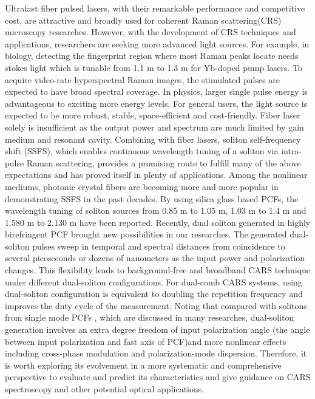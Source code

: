 \documentclass{osa-article}
\begin{document}
Ultrafast fiber pulsed lasers, with their remarkable performance and competitive cost, are attractive and broadly used for coherent Raman scattering(CRS) microscopy researches\cite{andresen_tunable_2006, andresen_stimulated_2011, Gottschall.2015, Krafft.2016}. However, with the development of CRS techniques and applications,  researchers are seeking more advanced light sources. For example, in biology, detecting the fingerprint region where most Raman peaks locate needs stokes light which is tunable from 1.1 \textmu m to 1.3 \textmu m for Yb-doped pump lasers\cite{Gottschall.2015}. To acquire video-rate hyperspectral Raman images, the stimulated pulses are expected to have broad spectral coverage. In physics, larger single pulse energy is advantageous to exciting more energy levels. For general users, the light source is expected to be more robust, stable, space-efficient and cost-friendly. Fiber laser solely is insufficient as the output power and spectrum are much limited by gain medium and resonant cavity. Combining with fiber lasers, soliton self-frequency shift (SSFS), which enables continuous wavelength tuning of a soliton via intra-pulse Raman scattering, provides a promising route to fulfill many of the above expectations and has proved itself in plenty of applications\cite{Paulsen2003,yuan_red-shifted_2015,Li.2017}. Among the nonlinear mediums, photonic crystal fibers are becoming more and more popular in demonstrating SSFS in the past decades. By using silica glass based PCFs, the wavelength tuning of soliton sources from 0.85 \textmu m to 1.05 \textmu m\cite{Su2013}, 1.03 \textmu m to 1.4 \textmu m\cite{Andresen.2007} and 1.580 \textmu m to 2.130 \textmu m\cite{wang.2011} have been reported. Recently, dual soliton generated in highly birefringent PCF brought new possibilities in our researches. The generated dual-soliton pulses sweep in temporal and spectral distances from coincidence to several picoseconds or dozens of nanometers as the input power and polarization changes. This flexibility leads to background-free\cite{chen_dual-soliton_2016} and broadband\cite{chen_cascaded_2016} CARS technique under different dual-soliton configurations. For dual-comb CARS systems\cite{ideguchi_coherent_2013, mohler_dual-comb_2017}, using dual-soliton configuration is equivalent to doubling the repetition frequency and improves the duty cycle of the measurement. Noting that compared with solitons from single mode PCFs \cite{klarskov_supercontinuum_2011,arteaga-sierra_supercontinuum_2014,Qiu.2014}, which are discussed in many researches, dual-soliton generation involves an extra degree freedom of input polarization angle (the angle between input polarization and fast axis of PCF)and more nonlinear effects including cross-phase modulation and polarization-mode dispersion. Therefore, it is worth exploring its evolvement in a more systematic and comprehensive perspective to evaluate and predict its characteristics and give guidance on CARS spectroscopy and other potential optical applications. 
\end{document}
